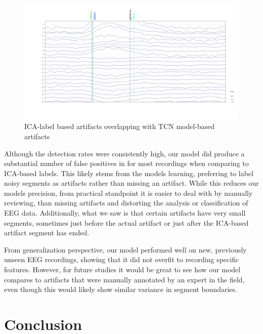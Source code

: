 \documentclass[12pt,a4paper,titlepage,openany]{report}
\begin{document}
\begin{figure}[H]
     \centering
     \includegraphics[width=1\linewidth]{./misc/artifact-overlaps.png}
     \caption{ICA-label based artifacts overlapping with TCN model-based artifacts}
     \label{fig:overlaps}
\end{figure}

Although the detection rates were consistently high, our model did produce a substantial number of false positives in for most recordings when comparing to ICA-based labels. This likely stems from the models learning, preferring to label noisy segments as artifacts rather than missing an artifact. While this reduces our models precision, from practical standpoint it is easier to deal with by manually reviewing, than missing artifacts and distorting the analysis or classification of EEG data. Additionally, what we saw is that certain artifacts have very small segments, sometimes just before the actual artifact or just after the ICA-based artifact segment has ended.

From generalization perspective, our model performed well on new, previously unseen EEG recordings, showing that it did not overfit to recording specific features. However, for future studies it would be great to see how our model compares to artifacts that were manually annotated by an expert in the field, even though this would likely show similar variance in segment boundaries.



\chapter{Conclusion}
\thispagestyle{fancy}
\end{document}
